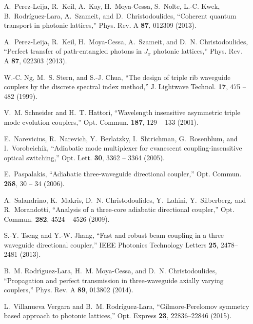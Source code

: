 \documentclass[9pt,twocolumn,twoside]{osajnl}
\begin{document}
\begin{thebibliography}{10}
A.~Perez-Leija, R.~Keil, A.~Kay, H.~Moya-Cessa, S.~Nolte, L.-C. Kwek,
  B.~Rodr\'{i}guez-Lara, A.~Szameit, and D.~Christodoulides, \enquote{Coherent
  quantum transport in photonic lattices,} Phys. Rev. A \textbf{87}, 012309
  (2013).

A.~Perez-Leija, R.~Keil, H.~Moya-Cessa, A.~Szameit, and D.~N. Christodoulides,
  \enquote{Perfect transfer of path-entangled photons in $J_{x}$ photonic
  lattices,} Phys. Rev. A \textbf{87}, 022303 (2013).

W.-C. Ng, M.~S. Stern, and S.-J. Chua, \enquote{The design of triple rib
  waveguide couplers by the discrete spectral index method,} J. Lightwave
  Technol. \textbf{17}, 475 -- 482 (1999).

V.~M. Schneider and H.~T. Hattori, \enquote{Wavelength insensitive asymmetric
  triple mode evolution couplers,} Opt. Commun. \textbf{187}, 129 -- 133
  (2001).

E.~Narevicius, R.~Narevich, Y.~Berlatzky, I.~Shtrichman, G.~Rosenblum, and
  I.~Vorobeichik, \enquote{Adiabatic mode multiplexer for
  evanescent coupling-insensitive optical switching,} Opt. Lett. \textbf{30},
  3362 -- 3364 (2005).

E.~Paspalakis, \enquote{Adiabatic three-waveguide directional coupler,} Opt.
  Commun. \textbf{258}, 30 -- 34 (2006).

A.~Salandrino, K.~Makris, D.~N. Christodoulides, Y.~Lahini, Y.~Silberberg, and
  R.~Morandotti, \enquote{Analysis of a three-core adiabatic directional
  coupler,} Opt. Commun. \textbf{282}, 4524 -- 4526 (2009).

S.-Y. Tseng and Y.-W. Jhang, \enquote{Fast and robust beam coupling in a three
  waveguide directional coupler,} IEEE Photonics Technology Letters
  \textbf{25}, 2478--2481 (2013).

B.~M. Rodr{\'\i}guez-Lara, H.~M. Moya-Cessa, and D.~N. Christodoulides,
  \enquote{Propagation and perfect transmission in three-waveguide axially
  varying couplers,} Phys. Rev. A \textbf{89}, 013802 (2014).

L.~Villanueva Vergara and B.~M. Rodr\'iguez-Lara, \enquote{Gilmore-Perelomov symmetry
  based approach to photonic lattices,} Opt. Express \textbf{23}, 22836--22846
  (2015).


\end{thebibliography}
\end{document}

